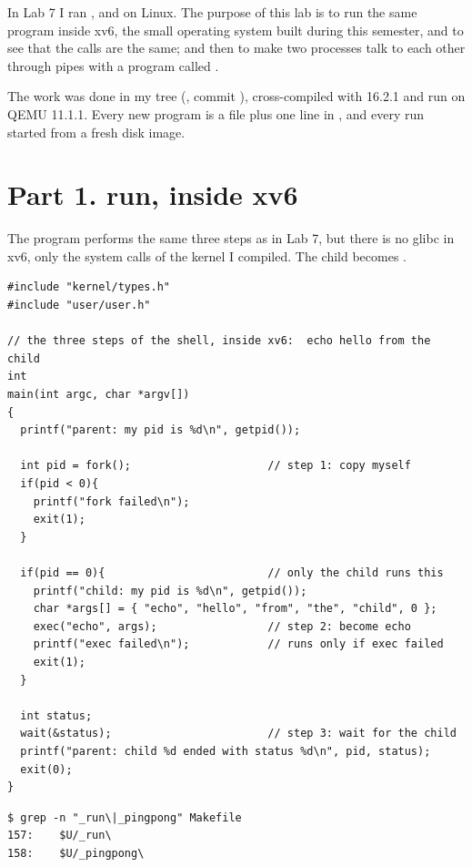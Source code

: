 \documentclass[11pt,a4paper]{article}
\begin{document}
\utmtitlepage
\tableofcontents
\newpage


In Lab 7 I ran ,  and  on Linux. The purpose of this lab is to
run the same program inside xv6, the small operating system built during this semester, and to
see that the calls are the same; and then to make two processes talk to each other through pipes
with a program called .

The work was done in my  tree (, commit
), cross-compiled with  16.2.1 and run on QEMU 11.1.1.
Every new program is a file  plus one line  in
, and every run started from a fresh disk image.

\section{Part 1. run, inside xv6}

The program performs the same three steps as  in Lab 7, but there is no glibc in
xv6, only the system calls of the kernel I compiled. The child becomes .

\begin{lstlisting}[style=ccode,caption={user/run.c}]
#include "kernel/types.h"
#include "user/user.h"

// the three steps of the shell, inside xv6:  echo hello from the child
int
main(int argc, char *argv[])
{
  printf("parent: my pid is %d\n", getpid());

  int pid = fork();                     // step 1: copy myself
  if(pid < 0){
    printf("fork failed\n");
    exit(1);
  }

  if(pid == 0){                         // only the child runs this
    printf("child: my pid is %d\n", getpid());
    char *args[] = { "echo", "hello", "from", "the", "child", 0 };
    exec("echo", args);                 // step 2: become echo
    printf("exec failed\n");            // runs only if exec failed
    exit(1);
  }

  int status;
  wait(&status);                        // step 3: wait for the child
  printf("parent: child %d ended with status %d\n", pid, status);
  exit(0);
}
\end{lstlisting}

\begin{lstlisting}[caption={The UPROGS lines for run and pingpong}]
$ grep -n "_run\|_pingpong" Makefile
157:	$U/_run\
158:	$U/_pingpong\
\end{lstlisting}
\end{document}
